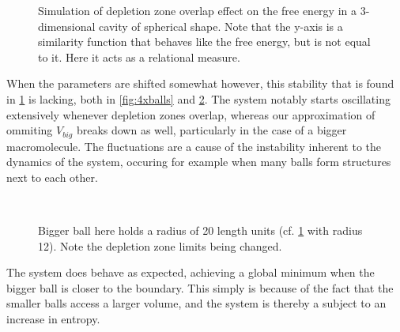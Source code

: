 \documentclass[a4paper,12pt]{article}
\theoremstyle{plain}
\theoremstyle{definition}
\begin{document}
   \begin{figure}[H]
      \centering
      \resizebox{.6\columnwidth}{!}{}
      \caption{Simulation of depletion zone overlap effect on the free energy in
         a 3-dimensional cavity of spherical shape. Note that the y-axis is
         a similarity function that behaves like the free energy, but is not equal to
         it. Here it acts as a relational measure.}
      \label{fig:pmfa}            
   \end{figure}

   When the parameters are shifted somewhat however, this stability that is
   found in \cref{fig:pmfa} is lacking, both in \cref{fig:4xballs} and
   \cref{fig:gigaball}. The system notably starts oscillating extensively
   whenever depletion zones overlap, whereas our approximation of ommiting
   $V_{big}$ breaks down as well, particularly in the case of a bigger
   macromolecule. The fluctuations are a cause of the instability inherent to
   the dynamics of the system, occuring for example when many balls form
   structures next to each other. 

   \begin{figure}[H]
      \vspace*{1cm}
      \hspace*{-2cm}
      \centering
      \begin{minipage}[t]{.6\textwidth}		
         \vspace{0pt}
         \centering
         \resizebox{\columnwidth}{!}{}
         \caption{Simulation performed with 200 balls (cf. \cref{fig:pmfa} with
         50 balls). Note the fluctuation behaviour as the depletion zones
         overlap.}
         \label{fig:4xballs}
      \end{minipage}~\hspace*{1em}
      \begin{minipage}[t]{.6\textwidth}		
         \vspace{0pt}
         \centering
         \resizebox{\columnwidth}{!}{}
         \caption{Bigger ball here holds a radius of 20 length units (cf.
         \cref{fig:pmfa} with radius 12). Note the depletion zone limits being
         changed.} 
         \label{fig:gigaball}
      \end{minipage}
   \end{figure}

   The system does behave as expected, achieving a global minimum when the
   bigger ball is closer to the boundary. This simply is because of the fact
   that the smaller balls access a larger volume, and the system is thereby a
   subject to an increase in entropy.  
\end{document}
